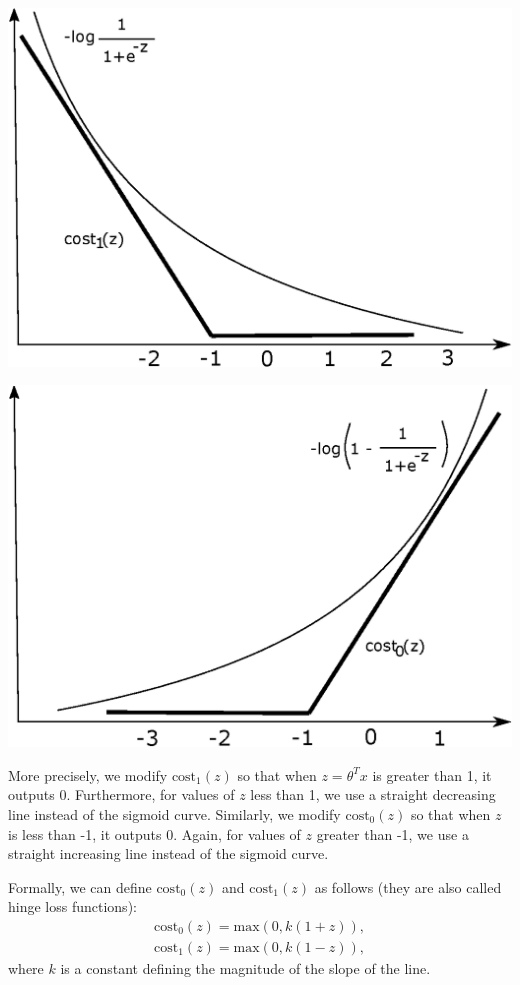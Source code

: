 \documentclass[a4paper,11pt]{report}
\begin{document}
\begin{center}
\begin{minipage}{0.48\textwidth}
 \centering
 \includegraphics[width=.8\linewidth]{Images/cost_1_approx}
\end{minipage}\hfill
\begin{minipage}{0.48\textwidth}
 \centering
 \includegraphics[width=.8\linewidth]{Images/cost_0_approx}
\end{minipage}
\end{center}

More precisely, we modify $\text{cost}_1(z)$ so that when $z = \theta^Tx$ is greater than 1, it outputs 0. Furthermore, for values of $z$ less than 1, we use a straight decreasing line instead of the sigmoid curve.
Similarly, we modify $\text{cost}_0(z)$ so that when $z$ is less than -1, it outputs 0. Again, for values of $z$ greater than -1, we use a straight increasing line instead of the sigmoid curve.

Formally, we can define $\text{cost}_0(z)$ and $\text{cost}_1(z)$ as follows (they are also called hinge loss functions):
\begin{equation}\label{eq:hinge-loss}
\begin{split}
\text{cost}_0(z) = \text{max}(0,k(1+z)),\\
\text{cost}_1(z) = \text{max}(0,k(1−z)),
\end{split}
\end{equation}
where $k$ is a constant defining the magnitude of the slope of the line.
\end{document}
